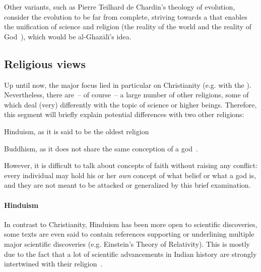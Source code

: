 Other variants, such as Pierre Teilhard de Chardin's theology of evolution, consider the evolution to be far from complete, striving towards a  that enables the unification of science and religion (the reality of the world and the reality of God~\cite{teilhard1971christianity}), which would be al-Ghazālī's idea.


\subsection{Religious views}

\label{subsec:religious-views}Up until now, the major focus lied in particular on Christianity (e.g. with the ).
Nevertheless, there are~-- of course~-- a large number of other religions, some of which deal (very) differently with the topic of science or higher beings.
Therefore, this segment will briefly explain potential differences with two other religions: \begin{inlist}
    \item Hinduism, as it is said to be the oldest religion~\cite[p.~732]{Kurien2006}
    \item Buddhism, as it does not share the same conception of a god~\cite{roloff2011buddhismus}.
\end{inlist}

However, it is difficult to talk about concepts of faith without raising any conflict: every individual may hold his or her \emph{own} concept of what belief or what a god is, and they are not meant to be attacked or generalized by this brief examination.

\paragraph{Hinduism} In contrast to Christianity, Hinduism has been more open to scientific discoveries, some texts are even said to contain references supporting or underlining multiple major scientific discoveries (e.g. Einstein's Theory of Relativity).
This is mostly due to the fact that a lot of scientific advancements in Indian history are strongly intertwined with their religion~\cite{mitcham2005encyclopedia}.

